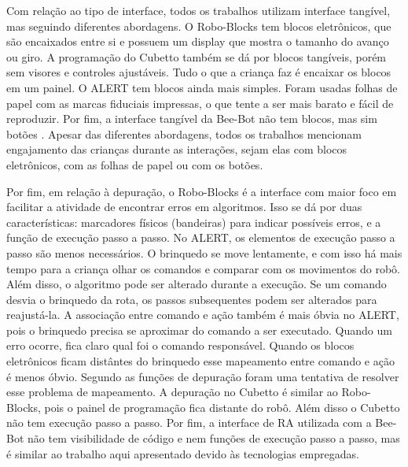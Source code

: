 Com relação ao tipo de interface, todos os trabalhos utilizam interface tangível, mas seguindo diferentes abordagens. O Robo-Blocks tem blocos eletrônicos, que são encaixados entre si e possuem um display que mostra o tamanho do avanço ou giro. A programação do Cubetto também se dá por blocos tangíveis, porém sem visores e controles ajustáveis. Tudo o que a criança faz é encaixar os blocos em um painel. O ALERT tem blocos ainda mais simples. Foram usadas folhas de papel com as marcas fiduciais impressas, o que tente a ser mais barato e fácil de reproduzir. Por fim, a interface tangível da Bee-Bot não tem blocos, mas sim botões  \cite{yu_review_2019}. Apesar das diferentes abordagens, todos os trabalhos mencionam engajamento das crianças durante as interações, sejam elas com blocos eletrônicos, com as folhas de papel ou com os botões.

Por fim, em relação à depuração, o Robo-Blocks é a interface com maior foco em facilitar a atividade de encontrar erros em algoritmos. Isso se dá por duas características: marcadores físicos (bandeiras) para indicar possíveis erros, e a função de execução passo a passo.
No ALERT, os elementos de execução passo a passo são menos necessários. O brinquedo se move lentamente, e com isso há mais tempo para a criança olhar os comandos e comparar com os movimentos do robô. Além disso, o algoritmo pode ser alterado durante a execução. Se um comando desvia o brinquedo da rota, os passos subsequentes podem ser alterados para reajustá-la. A associação entre comando e ação também é mais óbvia no ALERT, pois o brinquedo precisa se aproximar do comando a ser executado. Quando um erro ocorre, fica claro qual foi o comando responsável. Quando os blocos eletrônicos ficam distântes do brinquedo esse mapeamento entre comando e ação é menos óbvio. Segundo   as funções de depuração foram uma tentativa de resolver esse problema de mapeamento. A depuração no Cubetto é similar ao Robo-Blocks, pois o painel de programação fica distante do robô. Além disso o Cubetto não tem execução passo a passo. Por fim, a interface de RA utilizada com a Bee-Bot  \cite{beraza_soft_2010} não tem visibilidade de código e nem funções de execução passo a passo, mas é similar ao trabalho aqui apresentado devido às tecnologias empregadas.

